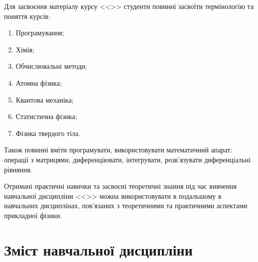 \documentclass{Syllabus}
\begin{document}

Для засвоєння матеріалу курсу <<\discipline>> студенти повинні засвоїти термінологію та поняття курсів:
\begin{enumerate}
    \item Програмування;
    \item Хімія;
    \item Обчислювальні методи;
    \item Атомна фізика;
    \item Квантова механіка;
    \item Статистична фізика;
    \item Фізика твердого тіла.
\end{enumerate}

Також повинні вміти програмувати, використовувати математичний апарат: операції з матрицями,  диференціювати, інтегрувати, розв'язувати диференціальні рівняння.

Отримані практичні навички та засвоєні теоретичні знання під час вивчення навчальної дисципліни <<\discipline>> можна використовувати в подальшому в навчальних дисциплінах, пов’язаних з теоретичними та практичними аспектами прикладної фізики.

\section{Зміст навчальної дисципліни}\label{sec:zmist}

\end{document}

